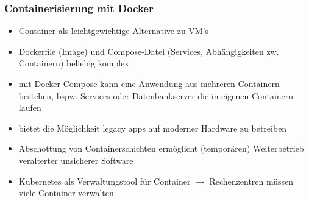 \clearpage
\subsubsection{Containerisierung mit Docker}

\begin{itemize}
  \item Container als leichtgewichtige Alternative zu VM's
  \item Dockerfile (Image) und Compose-Datei (Services, Abhängigkeiten zw. Containern) beliebig komplex
  \item mit Docker-Compose kann eine Anwendung aus mehreren Containern bestehen, bspw. Services oder Datenbankserver die in eigenen Containern laufen
  \item bietet die Möglichkeit legacy apps auf moderner Hardware zu betreiben
  \item Abschottung von Containerschichten ermöglicht (temporären) Weiterbetrieb veralterter unsicherer Software
  \item Kubernetes als Verwaltungstool für Container $\rightarrow$ Rechenzentren müssen viele Container verwalten
\end{itemize}